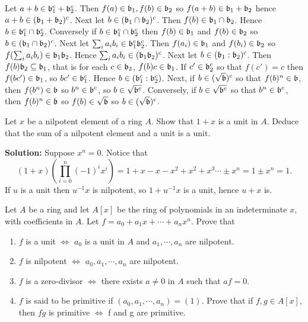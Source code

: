 \documentclass{article}
\begin{document}
Let \(a + b \in \mathfrak{b}_1^c + \mathfrak{b}_2^c\).
Then \(f(a) \in \mathfrak{b}_1, f(b) \in \mathfrak{b}_2\) so \(f(a + b) \in \mathfrak{b}_1 + \mathfrak{b}_2\) hence \(a + b \in (\mathfrak{b}_1 + \mathfrak{b}_2)^c\).
Next let \(b \in (\mathfrak{b}_1 \cap \mathfrak{b}_2)^c\).
Then \(f(b) \in \mathfrak{b}_1 \cap \mathfrak{b}_2\).
Hence \(b \in \mathfrak{b}_1^c \cap \mathfrak{b}_2^c\).
Conversely if \(b \in \mathfrak{b}_1^c \cap \mathfrak{b}_2^c\) then \(f(b) \in \mathfrak{b}_1\) and \(f(b) \in \mathfrak{b}_2\) so \(b \in (\mathfrak{b}_1 \cap \mathfrak{b}_2)^c\).
Next let \(\sum_i a_i b_i \in \mathfrak{b}_1^c \mathfrak{b}_2^c\).
Then \(f(a_i) \in \mathfrak{b}_1\) and \(f(b_i) \in \mathfrak{b}_2\) so \(f(\sum_i a_i b_i) \in \mathfrak{b}_1 \mathfrak{b}_2\).
Hence \(\sum_i a_i b_i \in (\mathfrak{b}_1 \mathfrak{b}_2)^c\).
Next let \(b \in (\mathfrak{b}_1 : \mathfrak{b}_2)^c\).
Then \(f(b) \mathfrak{b}_2 \subseteq \mathfrak{b}_1\), that is for each \(c \in \mathfrak{b}_2\), \(f(b) c \in \mathfrak{b}_1\).
If \(c' \in \mathfrak{b}_2^c\) so that \(f(c') = c\) then \(f(b c') \in \mathfrak{b}_1\), so \(bc' \in \mathfrak{b}_1^c\).
Hence \(b \in (\mathfrak{b}_1^c : \mathfrak{b}_2^c)\).
Next, if \(b \in (\sqrt{\mathfrak{b}})^c\) so that \(f(b)^n \in \mathfrak{b}\), then \(f(b^n) \in \mathfrak{b}\) so \(b^n \in \mathfrak{b}^c\), so \(b \in \sqrt{\mathfrak{b}^c}\).
Conversely, if \(b \in \sqrt{\mathfrak{b}^c}\) so that \(b^n \in \mathfrak{b}^c\), then \(f(b)^n \in \mathfrak{b}\) so \(f(b) \in \sqrt{\mathfrak{b}}\) so \(b \in (\sqrt{\mathfrak{b}})^c\).

\setcounter{exercise}{0}
\renewcommand{\theexercise}{(\arabic{exercise})}

\begin{exercise} \label{ex1-1}
    Let \(x\) be a nilpotent element of a ring \(A\).
    Show that \(1 + x\) is a unit in \(A\).
    Deduce that the sum of a nilpotent element and a unit is a unit.
\end{exercise}

\noindent\textbf{Solution:}
Suppose \(x^n = 0\).
Notice that
\[
    (1 + x)(\prod_{i=0}^n (-1)^i x^i) = 1 + x - x - x^2 + x^2 + x^3 \cdots \pm x^n = 1 \pm x^n = 1.
\]
If \(u\) is a unit then \(u^{-1} x\) is nilpotent, so \(1 + u^{-1} x\) is a unit, hence \(u + x\) is.

\begin{exercise}
    Let \(A\) be a ring and let \(A[x]\) be the ring of polynomials in an indeterminate \(x\), with coefficients in \(A\).
    Let \(f = a_0 + a_1 x + \cdots + a_n x^n\). Prove that
    \begin{enumerate}
        \item \label{ex1-2-1}
            \(f\) is a unit \(\iff\) \(a_0\) is a unit in \(A\) and \(a_1, \cdots, a_n\) are nilpotent.
        \item
            \(f\) is nilpotent \(\iff\) \(a_0, a_1, \cdots, a_n\) are nilpotent.
        \item
            \(f\) is a zero-divisor \(\iff\) there exists \(a \neq 0\) in \(A\) such that \(a f = 0\).
        \item
            \(f\) is said to be primitive if \((a_0, a_1, \cdots, a_n) = (1)\).
            Prove that if \(f, g \in A[x]\), then \(fg\) is primitive \(\iff\) f and g are primitive.
    \end{enumerate}
\end{exercise}
\end{document}
